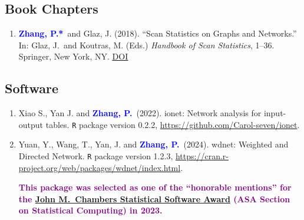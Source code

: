\documentclass[12pt]{article}
\def \DOI #1{\href{http://doi.org/#1}{\underline{DOI}}}
\newcommand{\PZ}{\textcolor{blue}{\textbf{Zhang, P.*}}}
\newcommand{\PZnot}{\textcolor{blue}{\textbf{Zhang, P.}}}
\newcommand{\purple}[1]{\textcolor{purple}{#1}}
\begin{document}
	\subsection*{Book Chapters}
	\begin{enumerate}
		\item \PZ\ and {\sc Glaz, J.} (2018). ``Scan 
		Statistics on Graphs and Networks.'' In: Glaz, J.\ and 
		Koutras, M. (Eds.) {\em Handbook of Scan Statistics}, 1--36. 
		Springer, New York, NY. 
		\DOI{10.1007/978-1-4614-8414-1_43-1}	
	\end{enumerate}
	
	\subsection*{Software}
	\begin{enumerate}
		\item{\sc Xiao S., Yan J.} and \PZnot\ (2022).
		ionet: Network analysis for input-output tables. {\tt R} 
		package version 0.2.2, 
		\url{https://github.com/Carol-seven/ionet}.
		
		\item {\sc Yuan, Y., Wang, T., Yan, J.} and \PZnot\ (2024). 
		wdnet: Weighted and Directed Network. {\tt R} package 
		version 
		1.2.3, 
		\url{https://cran.r-project.org/web/packages/wdnet/index.html}.
		
		\purple{\bf This package was selected as one of the 
		``honorable mentions'' for the  
		\href{https://community.amstat.org/jointscsg-section/awards/john-m-chambers}{John
		 M.\ Chambers Statistical Software Award} (ASA Section on 
		 Statistical Computing) in 2023.}
	\end{enumerate}
	
\end{document}
